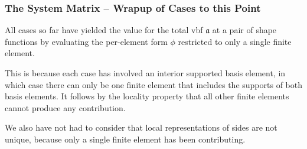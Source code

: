 \documentclass[compress]{beamer}
\begin{document}
\begin{frame}
  \frametitle{The System Matrix -- Wrapup of Cases to this Point}
  All cases so far have yielded the value for the total vbf $\mathfrak{a}$ at a pair of shape functions by evaluating the per-element
  form $\phi$ restricted to only a single finite element.
  
  \pause
  This is because each case has involved an interior supported basis element, in which case there can only be
  one finite element that includes the supports of both basis elements. It follows by the locality property that all
  other finite elements cannot produce any contribution.
  
  \pause
  \vspace{.15cm}
  We also have not had to consider that local representations of sides are not unique, because only a single finite element
  has been contributing. 
\end{frame}
\end{document}
